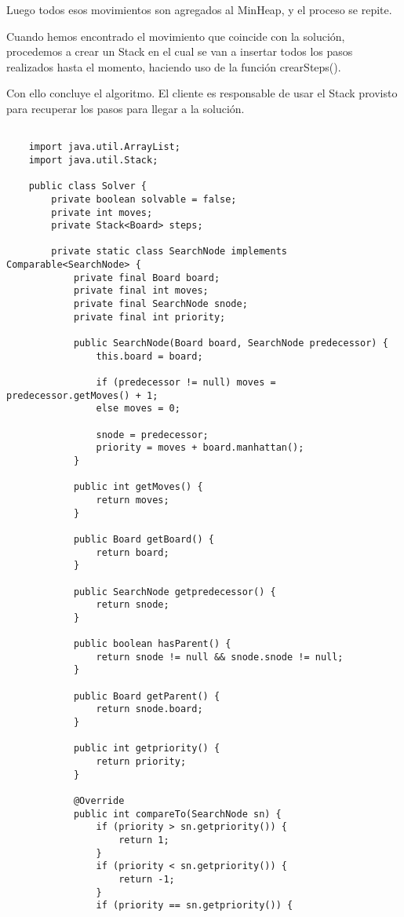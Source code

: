 \documentclass[paper=a4, fontsize=11pt]{scrartcl} %
\numberwithin{equation}{section} %
\numberwithin{figure}{section} %
\numberwithin{table}{section} %
\begin{document}
    Luego todos esos movimientos son agregados al MinHeap, y el proceso se repite.

    Cuando hemos encontrado el movimiento que coincide con la solución, procedemos a crear un Stack
    en el cual se van a insertar todos los pasos realizados hasta el momento, haciendo uso de la
    función crearSteps().

    Con ello concluye el algoritmo.
    El cliente es responsable de usar el Stack provisto para recuperar los pasos para llegar a
    la solución.

    \begin{lstlisting}

    import java.util.ArrayList;
    import java.util.Stack;

    public class Solver {
        private boolean solvable = false;
        private int moves;
        private Stack<Board> steps;

        private static class SearchNode implements Comparable<SearchNode> {
            private final Board board;
            private final int moves;
            private final SearchNode snode;
            private final int priority;

            public SearchNode(Board board, SearchNode predecessor) {
                this.board = board;

                if (predecessor != null) moves = predecessor.getMoves() + 1;
                else moves = 0;

                snode = predecessor;
                priority = moves + board.manhattan();
            }

            public int getMoves() {
                return moves;
            }

            public Board getBoard() {
                return board;
            }

            public SearchNode getpredecessor() {
                return snode;
            }

            public boolean hasParent() {
                return snode != null && snode.snode != null;
            }

            public Board getParent() {
                return snode.board;
            }

            public int getpriority() {
                return priority;
            }

            @Override
            public int compareTo(SearchNode sn) {
                if (priority > sn.getpriority()) {
                    return 1;
                }
                if (priority < sn.getpriority()) {
                    return -1;
                }
                if (priority == sn.getpriority()) {


\end{lstlisting}
\end{document}
